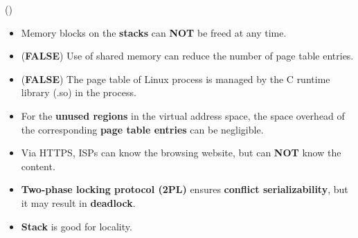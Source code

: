 \begin{theorem}{()}
\begin{itemize}
        \item Memory blocks on the \textbf{stacks} can \textbf{NOT} be freed at any time.
        \item (\textbf{FALSE}) Use of shared memory can reduce the number of page table entries.
        \item (\textbf{FALSE}) The page table of Linux process is managed by the C runtime library (.so) in the process.
        \item For the \textbf{unused regions} in the virtual address space, the space overhead of the corresponding \textbf{page table entries} can be negligible.
        \item Via HTTPS, ISPs can know the browsing website, but can \textbf{NOT} know the content.
        \item \textbf{Two-phase locking protocol (2PL)} ensures \textbf{conflict serializability}, but it may result in \textbf{deadlock}.
        \item \textbf{Stack} is good for locality.
    \end{itemize}
\end{theorem}
